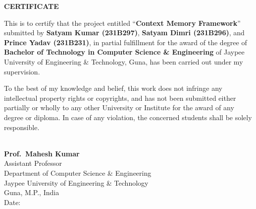 \newpage
\thispagestyle{plain}
\begingroup
\setlength{\parskip}{6pt}
\fontsize{14}{21}\selectfont

\begin{center}
    {\fontsize{16}{24}\selectfont\bfseries CERTIFICATE\\[12pt]}
\end{center}

This is to certify that the project entitled ``\textbf{Context Memory Framework}'' submitted by \textbf{Satyam Kumar
(231B297)}, \textbf{Satyam Dimri (231B296)}, and \textbf{Prince Yadav (231B231)}, in partial
fulfillment for the award of the degree of \textbf{Bachelor of Technology in Computer
Science \& Engineering} of Jaypee University of Engineering \& Technology, Guna, has been
carried out under my supervision.

To the best of my knowledge and belief, this work does not infringe any intellectual
property rights or copyrights, and has not been submitted either partially or wholly to any
other University or Institute for the award of any degree or diploma. In case of any
violation, the concerned students shall be solely responsible.

\vfill

\noindent\underline{\hspace{5cm}}\\[8pt]
\textbf{Prof.\ Mahesh Kumar}\\
Assistant Professor\\
Department of Computer Science \& Engineering\\
Jaypee University of Engineering \& Technology\\
Guna, M.P., India\\[12pt]
Date:\enspace\underline{\hspace{3.5cm}}

\endgroup
\clearpage
